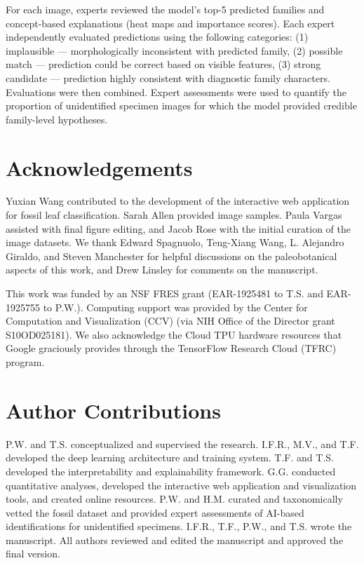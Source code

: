 \documentclass[pdflatex,lineno,sn-nature]{sn-jnl}%
\theoremstyle{plain}%
\theoremstyle{definition}%
\theoremstyle{remark}%
\begin{document}
For each image, experts reviewed the model's top-5 predicted families and concept-based explanations (heat maps and importance scores). Each expert independently evaluated predictions using the following categories: (1) implausible --- morphologically inconsistent with predicted family, (2) possible match --- prediction could be correct based on visible features, (3) strong candidate --- prediction highly consistent with diagnostic family characters. Evaluations were then combined. Expert assessments were used to quantify the proportion of unidentified specimen images for which the model provided credible family-level hypotheses.


% 




\section*{Acknowledgements}
Yuxian Wang contributed to the development of the interactive web application for fossil leaf classification. Sarah Allen provided image samples. Paula Vargas assisted with final figure editing, and Jacob Rose with the initial curation of the image datasets. We thank Edward Spagnuolo, Teng-Xiang Wang, L. Alejandro Giraldo, and Steven Manchester for helpful discussions on the paleobotanical aspects of this work, and Drew Linsley for comments on the manuscript.

This work was funded by an NSF FRES grant (EAR-1925481 to T.S. and EAR-1925755 to P.W.).  Computing support was provided by the Center for Computation and Visualization (CCV) (via NIH Office of the Director grant S10OD025181). We also acknowledge the Cloud TPU hardware resources that Google graciously provides through the TensorFlow Research Cloud (TFRC) program. 


\section*{Author Contributions}

P.W. and T.S. conceptualized and supervised the research. I.F.R., M.V., and T.F. developed the deep learning architecture and training system. T.F. and T.S. developed the interpretability and explainability framework. G.G. conducted quantitative analyses, developed the interactive web application and visualization tools, and created online resources. P.W. and H.M. curated and taxonomically vetted the fossil dataset and provided expert assessments of AI-based identifications for unidentified specimens. I.F.R., T.F., P.W., and T.S. wrote the manuscript. All authors reviewed and edited the manuscript and approved the final version.
\end{document}
